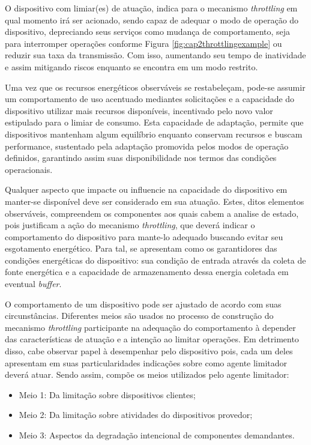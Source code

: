 O dispositivo com limiar(es) de atuação, indica para o mecanismo \textit{throttling} em qual momento irá ser acionado, sendo capaz de adequar o modo de operação do dispositivo, depreciando seus serviços como mudança de comportamento, seja para interromper operações conforme Figura \ref{fig:cap2throttlingexample} ou reduzir sua taxa da transmissão. Com isso, aumentando seu tempo de inatividade e assim mitigando riscos enquanto se encontra em um modo restrito. 

Uma vez que os recursos energéticos observáveis se restabeleçam, pode-se assumir um comportamento de uso acentuado mediantes solicitações e a capacidade do dispositivo utilizar mais recursos disponíveis, incentivado pelo novo valor estipulado para o limiar de consumo. Esta capacidade de adaptação, permite que dispositivos mantenham algum equilíbrio enquanto conservam recursos e buscam performance, sustentado pela adaptação promovida pelos modos de operação definidos, garantindo assim suas disponibilidade nos termos das condições operacionais.


Qualquer aspecto que impacte ou influencie na capacidade do dispositivo em manter-se disponível deve ser considerado em sua atuação. Estes, ditos elementos observáveis, compreendem os componentes aos quais cabem a analise de estado, pois justificam a ação do mecanismo \textit{throttling}, que deverá indicar o comportamento do dispositivo para mante-lo adequado buscando evitar seu esgotamento energético. Para tal, se apresentam como os garantidores das condições energéticas do dispositivo: sua condição de entrada através da coleta de fonte energética e a capacidade de armazenamento dessa energia coletada em eventual \textit{buffer}. 

O comportamento de um dispositivo pode ser ajustado de acordo com suas circunstâncias. Diferentes meios são usados no processo de construção do mecanismo \textit{throttling} participante na adequação do comportamento à depender das características de atuação e a intenção ao limitar operações. Em detrimento disso, cabe observar papel à desempenhar pelo dispositivo pois, cada um deles apresentam em suas particularidades indicações sobre como agente limitador deverá atuar. Sendo assim, compõe os meios utilizados pelo agente limitador:

\begin{itemize}
	\item Meio 1: Da limitação sobre dispositivos clientes; 
	\item Meio 2: Da limitação sobre atividades do dispositivos provedor;
	\item Meio 3: Aspectos da degradação intencional de componentes demandantes.
\end{itemize}

